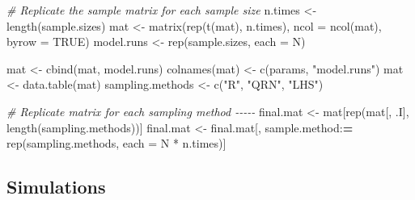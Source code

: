 \documentclass[
  11pt,
]{article}
\newenvironment{Shaded}{\begin{snugshade}}{\end{snugshade}}
\newcommand{\AttributeTok}[1]{\textcolor[rgb]{0.77,0.63,0.00}{#1}}
\newcommand{\CommentTok}[1]{\textcolor[rgb]{0.56,0.35,0.01}{\textit{#1}}}
\newcommand{\ConstantTok}[1]{\textcolor[rgb]{0.00,0.00,0.00}{#1}}
\newcommand{\ErrorTok}[1]{\textcolor[rgb]{0.64,0.00,0.00}{\textbf{#1}}}
\newcommand{\FunctionTok}[1]{\textcolor[rgb]{0.00,0.00,0.00}{#1}}
\newcommand{\NormalTok}[1]{#1}
\newcommand{\OtherTok}[1]{\textcolor[rgb]{0.56,0.35,0.01}{#1}}
\newcommand{\SpecialCharTok}[1]{\textcolor[rgb]{0.00,0.00,0.00}{#1}}
\newcommand{\StringTok}[1]{\textcolor[rgb]{0.31,0.60,0.02}{#1}}
\begin{document}
\begin{Shaded}
\begin{Highlighting}[]
\CommentTok{\# Replicate the sample matrix for each sample size}
\NormalTok{n.times }\OtherTok{\textless{}{-}} \FunctionTok{length}\NormalTok{(sample.sizes)}
\NormalTok{mat }\OtherTok{\textless{}{-}} \FunctionTok{matrix}\NormalTok{(}\FunctionTok{rep}\NormalTok{(}\FunctionTok{t}\NormalTok{(mat), n.times), }\AttributeTok{ncol =} \FunctionTok{ncol}\NormalTok{(mat), }\AttributeTok{byrow =} \ConstantTok{TRUE}\NormalTok{)}
\NormalTok{model.runs }\OtherTok{\textless{}{-}} \FunctionTok{rep}\NormalTok{(sample.sizes, }\AttributeTok{each =}\NormalTok{ N)}

\NormalTok{mat }\OtherTok{\textless{}{-}} \FunctionTok{cbind}\NormalTok{(mat, model.runs)}
\FunctionTok{colnames}\NormalTok{(mat) }\OtherTok{\textless{}{-}} \FunctionTok{c}\NormalTok{(params, }\StringTok{"model.runs"}\NormalTok{)}
\NormalTok{mat }\OtherTok{\textless{}{-}} \FunctionTok{data.table}\NormalTok{(mat)}
\NormalTok{sampling.methods }\OtherTok{\textless{}{-}} \FunctionTok{c}\NormalTok{(}\StringTok{"R"}\NormalTok{, }\StringTok{"QRN"}\NormalTok{, }\StringTok{"LHS"}\NormalTok{)}

\CommentTok{\# Replicate matrix for each sampling method {-}{-}{-}{-}{-}}
\NormalTok{final.mat }\OtherTok{\textless{}{-}}\NormalTok{ mat[}\FunctionTok{rep}\NormalTok{(mat[, .I], }\FunctionTok{length}\NormalTok{(sampling.methods))]}
\NormalTok{final.mat }\OtherTok{\textless{}{-}}\NormalTok{ final.mat[, sample.method}\SpecialCharTok{:}\ErrorTok{=} \FunctionTok{rep}\NormalTok{(sampling.methods, }\AttributeTok{each =}\NormalTok{ N }\SpecialCharTok{*}\NormalTok{ n.times)]}
\end{Highlighting}
\end{Shaded}

\hypertarget{simulations}{%
\subsection{Simulations}\label{simulations}}
\end{document}
